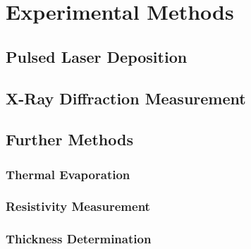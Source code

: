 \chapter{Experimental Methods}

\section{Pulsed Laser Deposition}
    

\section{X-Ray Diffraction Measurement}
    
        \label{Sec:Methods_XRD}

\section{Further Methods}
    \subsection{Thermal Evaporation}
        
    \subsection{Resistivity Measurement}
        
    \subsection{Thickness Determination}
        